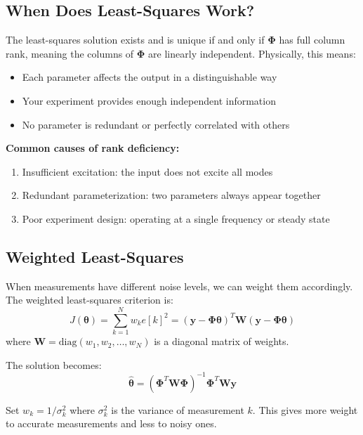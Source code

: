 \subsection{When Does Least-Squares Work?}

The least-squares solution exists and is unique if and only if $\mathbf{\Phi}$ has full column rank, meaning the columns of $\mathbf{\Phi}$ are linearly independent. Physically, this means:

\begin{itemize}
    \item Each parameter affects the output in a distinguishable way
    \item Your experiment provides enough independent information
    \item No parameter is redundant or perfectly correlated with others
\end{itemize}

\textbf{Common causes of rank deficiency:}
\begin{enumerate}
    \item Insufficient excitation: the input does not excite all modes
    \item Redundant parameterization: two parameters always appear together
    \item Poor experiment design: operating at a single frequency or steady state
\end{enumerate}

\subsection{Weighted Least-Squares}

When measurements have different noise levels, we can weight them accordingly. The weighted least-squares criterion is:
\begin{equation}
J(\boldsymbol{\theta}) = \sum_{k=1}^N w_k e[k]^2 = (\mathbf{y} - \mathbf{\Phi}\boldsymbol{\theta})^T \mathbf{W} (\mathbf{y} - \mathbf{\Phi}\boldsymbol{\theta})
\end{equation}
where $\mathbf{W} = \text{diag}(w_1, w_2, \ldots, w_N)$ is a diagonal matrix of weights.

The solution becomes:
\begin{equation}
\hat{\boldsymbol{\theta}} = (\mathbf{\Phi}^T\mathbf{W}\mathbf{\Phi})^{-1}\mathbf{\Phi}^T\mathbf{W}\mathbf{y}
\end{equation}

Set $w_k = 1/\sigma_k^2$ where $\sigma_k^2$ is the variance of measurement $k$. This gives more weight to accurate measurements and less to noisy ones.

